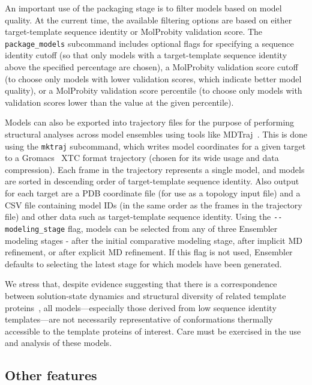 \documentclass[aps,pre,twocolumn,nofootinbib,superscriptaddress,linenumbers]{revtex4-1}
\begin{document}
\color{red}
An important use of the packaging stage is to filter models based on model quality.
At the current time, the available filtering options are based on either target-template sequence identity or MolProbity validation score.
The {\tt package\_models} subcommand includes optional flags for specifying a sequence identity cutoff (so that only models with a target-template sequence identity above the specified percentage are chosen), a MolProbity validation score cutoff (to choose only models with lower validation scores, which indicate better model quality), or a MolProbity validation score percentile (to choose only models with validation scores lower than the value at the given percentile).

Models can also be exported into trajectory files for the purpose of performing structural analyses across model ensembles using tools like MDTraj~\cite{mdtraj}.
This is done using the {\tt mktraj} subcommand, which writes model coordinates for a given target to a Gromacs~\cite{berendsen:1995:gromacs,lindahl:2001:gromacs} XTC format trajectory (chosen for its wide usage and data compression).
Each frame in the trajectory represents a single model, and  models are sorted in descending order of target-template sequence identity.
Also output for each target are a PDB coordinate file (for use as a topology input file) and a CSV file containing model IDs (in the same order as the frames in the trajectory file) and other data such as target-template sequence identity.
Using the {\tt -{}-modeling\_stage} flag, models can be selected from any of three Ensembler modeling stages - after the initial comparative modeling stage, after implicit MD refinement, or after explicit MD refinement.
If this flag is not used, Ensembler defaults to selecting the latest stage for which models have been generated.

\color{red}
We stress that, despite evidence suggesting that there is a correspondence between solution-state dynamics and structural diversity of related template proteins~\cite{friedland:plos-comput-biol:2009:conformational-dynamics}, all models---especially those derived from low sequence identity templates---are not necessarily representative of conformations thermally accessible to the template proteins of interest.
Care must be exercised in the use and analysis of these models.
\color{black}

\subsection*{Other features}
\end{document}
